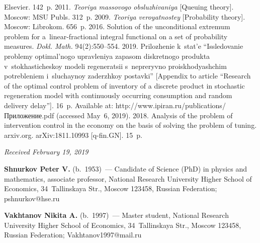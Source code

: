 \begin{multicols}{2}
{{\begin{thebibliography}{99}
Elsevier. 142~p.
 2011. \textit{Teoriya massovogo obsluzhivaniya} [Queuing theory]. 
Moscow: MSU Publs. 312~p.
 2009. \textit{Teoriya veroyatnostey}
[Probability theory]. Moscow:  Librokom. 656~p.
 2016. Solution of the unconditional extremum problem for 
a~linear-fractional integral functional on a set of probability measures. \textit{Dokl. 
Math.} 94(2):550--554.
 2019. Prilozhenie k~stat'e 
``Issledovanie problemy optimal'nogo upravleniya zapasom diskretnogo produkta 
v~sto\-kha\-sti\-che\-skoy modeli regeneratsii s~nepreryvno pro\-is\-kho\-dya\-shchim 
potrebleniem i~sluchaynoy zaderzhkoy postavki'' [Appendix to article ``Research 
of the optimal control problem of inventory of a discrete product in 
stochastic regeneration model with continuously occurring consumption 
and random delivery delay'']. 16~p. Available at: 
{\sf http://www.ipiran.ru/publications/Приложение.pdf} (accessed May~6, 
2019).  
 2018. Analysis of the problem of 
intervention control in the economy on the basis of solving the problem of 
tuning. arxiv.org.\linebreak 
arXiv:1811.10993 [q-fin.GN]. 15~p.

\end{thebibliography}

 }
 }

\end{multicols}

\vspace*{-9pt}

\hfill{\small\textit{Received February 19, 2019}}


\vspace*{-24pt}


\Contr

\vspace*{-3pt}

\noindent
\textbf{Shnurkov Peter V.} (b.\ 1953)~--- Candidate of Science (PhD) in physics 
and mathematics, associate professor, National Research University Higher School of 
Economics, 34~Tallinskaya Str., Moscow 123458, Russian Federation; 
\mbox{pshnurkov@hse.ru}


\noindent
\textbf{Vakhtanov Nikita A.} (b.\ 1997)~--- Master student, National Research 
University Higher School of Economics, 34~Tallinskaya Str., Moscow 123458, 
Russian Federation; \mbox{Vakhtanov1997@mail.ru}
\label{end\stat}

\renewcommand{\bibname}{\protect\rm Литература}